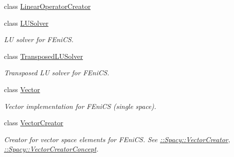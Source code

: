 \begin{DoxyCompactItemize}
class \hyperlink{classSpacy_1_1FEniCS_1_1LinearOperatorCreator}{Linear\+Operator\+Creator}
\item 
class \hyperlink{classSpacy_1_1FEniCS_1_1LUSolver}{L\+U\+Solver}
\begin{DoxyCompactList}\small\item\em L\+U solver for F\+Eni\+C\+S. \end{DoxyCompactList}\item 
class \hyperlink{classSpacy_1_1FEniCS_1_1TransposedLUSolver}{Transposed\+L\+U\+Solver}
\begin{DoxyCompactList}\small\item\em Transposed L\+U solver for F\+Eni\+C\+S. \end{DoxyCompactList}\item 
class \hyperlink{classSpacy_1_1FEniCS_1_1Vector}{Vector}
\begin{DoxyCompactList}\small\item\em Vector implementation for F\+Eni\+C\+S (single space). \end{DoxyCompactList}\item 
class \hyperlink{classSpacy_1_1FEniCS_1_1VectorCreator}{Vector\+Creator}
\begin{DoxyCompactList}\small\item\em Creator for vector space elements for F\+Eni\+C\+S. See \hyperlink{group__SpacyGroup_ga1f5316487c031a478247206764bb2efb_VectorCreatorAnchor}{\+:\+:Spacy\+:\+:Vector\+Creator}, \hyperlink{group__ConceptGroup_ga3064301642b7c66b1b08f88a12a04645_VectorCreatorConceptAnchor}{\+:\+:Spacy\+:\+:Vector\+Creator\+Concept}. \end{DoxyCompactList}\end{DoxyCompactItemize}
